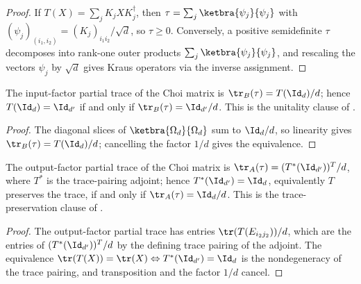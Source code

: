 \begin{proof}
    \leanok
    If $T(X)=\sum_j K_jXK_j^\dagger$, then
    $\tau=\sum_j\ketbra{\psi_j}{\psi_j}$ with
    $(\psi_j)_{(i_1,i_2)}=(K_j)_{i_1 i_2}/\sqrt{d}$, so $\tau\geq0$.
    Conversely, a positive semidefinite $\tau$ decomposes into rank-one
    outer products $\sum_j\ketbra{\psi_j}{\psi_j}$, and rescaling the
    vectors $\psi_j$ by $\sqrt{d}$ gives Kraus operators via the inverse
    assignment.
\end{proof}

\begin{theorem}[Unitality]
    \label{thm:choi_rect_unital}
    \leanok
    The input-factor partial trace of the Choi matrix is
    $\tr_B(\tau)=T(\Id_d)/d$; hence $T(\Id_d)=\Id_{d'}$ if and only if
    $\tr_B(\tau)=\Id_{d'}/d$. This is the unitality clause of
    \cite[Proposition~2.1]{Wolf2012Quantum}.
\end{theorem}

\begin{proof}
    \leanok
    The diagonal slices of $\ketbra{\Omega_d}{\Omega_d}$ sum to $\Id_d/d$,
    so linearity gives $\tr_B(\tau)=T(\Id_d)/d$; cancelling the factor
    $1/d$ gives the equivalence.
\end{proof}

\begin{theorem}
    \label{thm:choi_rect_tp}
    \leanok
    The output-factor partial trace of the Choi matrix is
    $\tr_A(\tau)=(T^*(\Id_{d'}))^{T}/d$, where $T^*$ is the trace-pairing
    adjoint; hence $T^*(\Id_{d'})=\Id_d$, equivalently $T$ preserves the
    trace, if and only if $\tr_A(\tau)=\Id_d/d$. This is the
    trace-preservation clause of \cite[Proposition~2.1]{Wolf2012Quantum}.
\end{theorem}

\begin{proof}
    \leanok
    The output-factor partial trace has entries
    $\tr(T(E_{i_2 j_2}))/d$, which are the entries of
    $(T^*(\Id_{d'}))^{T}/d$ by the defining trace pairing of the adjoint.
    The equivalence $\tr(T(X))=\tr(X)\Leftrightarrow T^*(\Id_{d'})=\Id_d$
    is the nondegeneracy of the trace pairing, and transposition and the
    factor $1/d$ cancel.
\end{proof}

